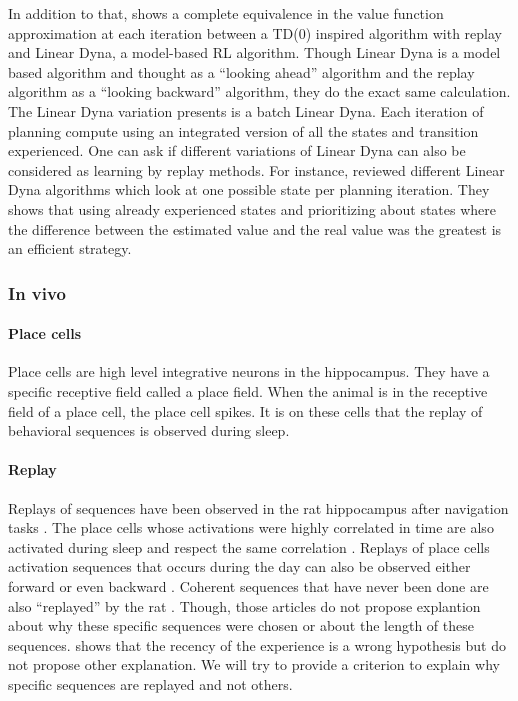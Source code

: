 \documentclass[]{article}
\begin{document}
In addition to that, \textcite{vanseijen_deeper_2015} shows a complete equivalence in the value function approximation at each iteration between a TD(0) inspired algorithm with replay and Linear Dyna, a model-based RL algorithm. Though Linear Dyna is a model based algorithm and thought as a ``looking ahead'' algorithm and the replay algorithm as a ``looking backward'' algorithm, they do the exact same calculation.
The Linear Dyna variation \textcite{vanseijen_deeper_2015} presents is a batch Linear Dyna. Each iteration of planning compute using an integrated version of all the states and transition experienced. One can ask if different variations of Linear Dyna can also be considered as learning by replay methods. For instance, \textcite{sutton_dyna-style_2012} reviewed different Linear Dyna algorithms which look at one possible state per planning iteration. They shows that using already experienced states and prioritizing about states where the difference between the estimated value and the real value was the greatest is an efficient strategy.

\subsubsection{In vivo}
\label{sub:In vivo}

\paragraph{Place cells}\label{place-cells}
Place cells are high level integrative neurons in the hippocampus. They have a specific receptive field called a place field. When the animal is in the receptive field of a place cell, the place cell spikes. It is on these cells that the replay of behavioral sequences is observed during sleep.

\paragraph{Replay}
Replays of sequences have been observed in the rat hippocampus after navigation tasks \parencite{wilson_reactivation_1994, skaggs_replay_1996, davidson_hippocampal_2009, gupta_hippocampal_2010}. The place cells whose activations were highly correlated in time are also activated during sleep and respect the same correlation \parencite{wilson_reactivation_1994}. Replays of place cells activation sequences that occurs during the day can also be observed either forward \parencite{skaggs_replay_1996} or even backward \parencite{gupta_hippocampal_2010}. Coherent sequences that have never been done are also ``replayed'' by the rat \parencite{gupta_hippocampal_2010}. Though, those articles do not propose explantion about why these specific sequences were chosen or about the length of these sequences. \textcite{gupta_hippocampal_2010} shows that the recency of the experience is a wrong hypothesis but do not propose other explanation. We will try to provide a criterion to explain why specific sequences are replayed and not others.
\end{document}
